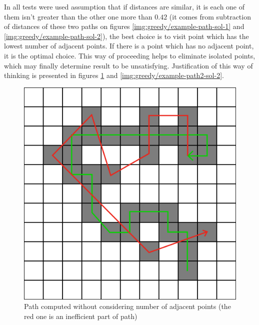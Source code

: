 \documentclass[titlepage]{article}
\newcommand{\multifigcaption}{\captionsetup{justification=justified}}
\begin{document}
 In all tests were used assumption that if distances are similar, it is each one of them isn't greater than the other one more than $0.42$ (it comes from subtraction of distances of these two paths on figures \ref{img:greedy/example-path-sol-1} and \ref{img:greedy/example-path-sol-2}), the best choice is to visit point which has the lowest number of adjacent points. If there is a point which has no adjacent point, it is the optimal choice. This way of proceeding helps to eliminate isolated points, which may finally determine result to be unsatisfying. Justification of this way of thinking is presented in figures \ref{img:greedy/example-path2-sol-1} and \ref{img:greedy/example-path2-sol-2}.
 
 \begin{figure}[H]
 	\begin{center}
 		\begin{minipage}{.45\linewidth}
 			\includegraphics[width=\textwidth]{img/greedy/example-path2-sol-1.png}
			\multifigcaption
 			\caption{Path computed without considering number of adjacent points (the red one is an inefficient part of path)}
 			\label{img:greedy/example-path2-sol-1}
 		\end{minipage}
 		\hspace{.05\linewidth}
 		\begin{minipage}{.45\linewidth}

\end{minipage}
\end{center}
\end{figure}
\end{document}
